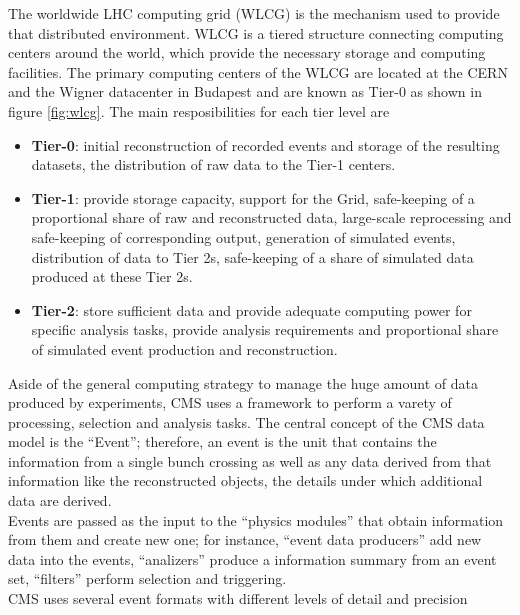 \noindent The worldwide LHC computing grid (WLCG) is the mechanism used to provide that distributed environment. WLCG is a tiered structure connecting computing centers around the world, which provide the necessary storage and computing facilities. The primary computing centers of the WLCG are located at the CERN and the Wigner datacenter in Budapest and are known as Tier-0 as shown in figure \ref{fig:wlcg}. The main resposibilities for each tier level are\cite{wlcg}

\begin{itemize}
\item \textbf{Tier-0}: initial reconstruction of recorded events and storage of the resulting datasets, the distribution of raw data to the Tier-1 centers.
\item \textbf{Tier-1}: provide storage capacity, support for the Grid, safe-keeping of a proportional share of raw and reconstructed data, large-scale reprocessing and safe-keeping of corresponding output, generation of simulated events, distribution of data to Tier 2s, safe-keeping of a share of simulated data produced at these Tier 2s.
\item \textbf{Tier-2}: store sufficient data and provide adequate computing power for specific analysis tasks, provide analysis requirements and proportional share of simulated event production and reconstruction.
\end{itemize}

\noindent Aside of the general computing strategy to manage the huge amount of data produced by experiments, CMS uses a framework to perform a varety of processing, selection and analysis tasks. The central concept of the CMS data model is the ``Event''; therefore, an event is the unit that contains the information from a single bunch crossing as well as any data derived from that information like the reconstructed objects, the details under which additional data are derived.\\

\noindent Events are passed as the input to the ``physics modules'' that obtain information from them and create new one; for instance, ``event data producers'' add new data into the events, ``analizers'' produce a information summary from an event set, ``filters'' perform selection and triggering.\\

\noindent CMS uses several event formats with different levels of detail and precision

